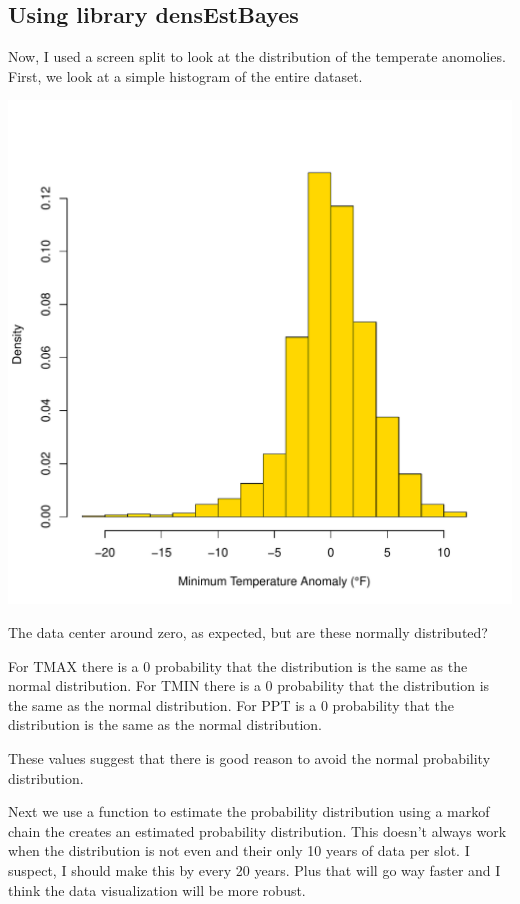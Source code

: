 \documentclass{article}\usepackage[]{graphicx}\usepackage[]{color}
\makeatletter
\def\maxwidth{ %
  \ifdim\Gin@nat@width>\linewidth
    \linewidth
  \else
    \Gin@nat@width
  \fi
}
\newenvironment{knitrout}{}{} %
\makeatother
\begin{document}
\subsection{Using library densEstBayes}

Now, I used a screen split to look at the distribution of the temperate anomolies. First, we look at a simple histogram of the entire dataset. 

\begin{knitrout}
\color{fgcolor}
\includegraphics[width=\maxwidth]{figure/unnamed-chunk-17-1} 
\end{knitrout}

The data center around zero, as expected, but are these normally distributed? 

For TMAX there is a 0 probability that the distribution is the same as the normal distribution. For TMIN there is a 0 probability that the distribution is the same as the normal distribution. For PPT is a 0 probability that the distribution is the same as the normal distribution.



These values suggest that there is good reason to avoid  the normal probability distribution. 

Next we use a function to estimate the probability distribution using a markof chain the creates an estimated probability distribution. This doesn't always work when the distribution is not even and their only 10 years of data per slot. I suspect, I should make this by every 20 years. Plus that will go way faster and I think the data visualization will be more robust. 
\end{document}
